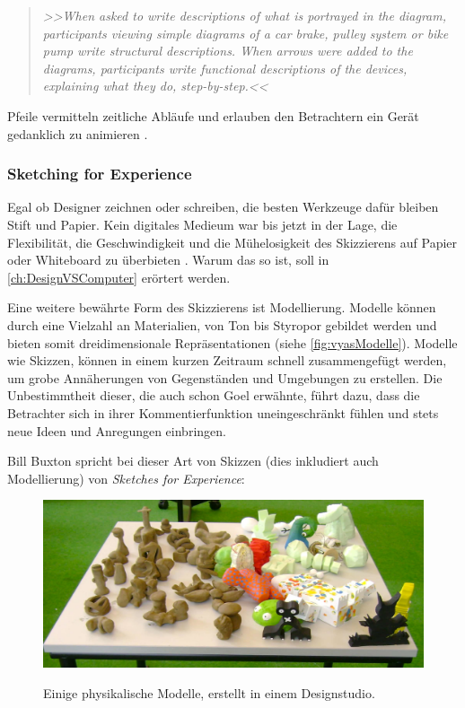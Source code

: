 \begin{quote}
	\textsl{>>When asked to write descriptions of what is portrayed in the diagram, participants viewing simple diagrams of a car brake, pulley system or bike pump write structural descriptions. When arrows were added to the diagrams, participants write functional descriptions of the devices, explaining what they do, step-by-step.<<}
\begin{flushright}\citep{Tversky:2002}\end{flushright}
\end{quote}

Pfeile vermitteln zeitliche Abläufe und erlauben den Betrachtern ein Gerät gedanklich zu animieren \citep{Hegarty:1992}.

\subsubsection{Sketching for Experience} 

Egal ob Designer zeichnen oder schreiben, die besten Werkzeuge dafür bleiben Stift und Papier. Kein digitales Medieum war bis jetzt in der Lage, die Flexibilität, die Geschwindigkeit und die Mühelosigkeit des Skizzierens auf Papier oder Whiteboard zu überbieten \citep{Sagmeister:2008}. Warum das so ist, soll in \autoref{ch:DesignVSComputer} erörtert werden.

\medskip Eine weitere bewährte Form des Skizzierens ist Modellierung. Modelle können durch eine Vielzahl an Materialien, von Ton bis Styropor gebildet werden und bieten somit dreidimensionale Repräsentationen (siehe \autoref{fig:vyasModelle}). Modelle wie Skizzen, können in einem kurzen Zeitraum schnell zusammengefügt werden, um grobe Annäherungen von Gegenständen und Umgebungen zu erstellen. Die Unbestimmtheit dieser, die auch schon Goel erwähnte, führt dazu, dass die Betrachter sich in ihrer Kommentierfunktion uneingeschränkt fühlen und stets neue Ideen und Anregungen einbringen.

\medskip Bill Buxton spricht bei dieser Art von Skizzen (dies inkludiert auch Modellierung) von \emph{Sketches for Experience}: 
\begin{figure}
	\begin{center}
        {\includegraphics[width=\linewidth]{gfx/vyasModelle}}
	\end{center}
		\caption[Physikalische Modelle. \newline \citep{Vyas:2008}]{Einige physikalische Modelle, erstellt in einem Designstudio.}\label{fig:vyasModelle}
\end{figure}

